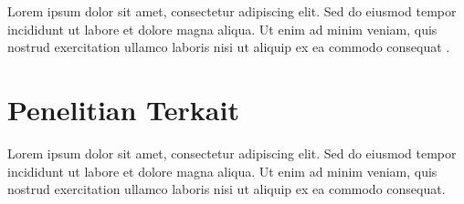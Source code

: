 Lorem ipsum dolor sit amet, consectetur adipiscing elit. Sed do eiusmod tempor incididunt ut labore et dolore magna aliqua. Ut enim ad minim veniam, quis nostrud exercitation ullamco laboris nisi ut aliquip ex ea commodo consequat \citep{referensi3}.

\section{Penelitian Terkait}


Lorem ipsum dolor sit amet, consectetur adipiscing elit. Sed do eiusmod tempor incididunt ut labore et dolore magna aliqua. Ut enim ad minim veniam, quis nostrud exercitation ullamco laboris nisi ut aliquip ex ea commodo consequat.
